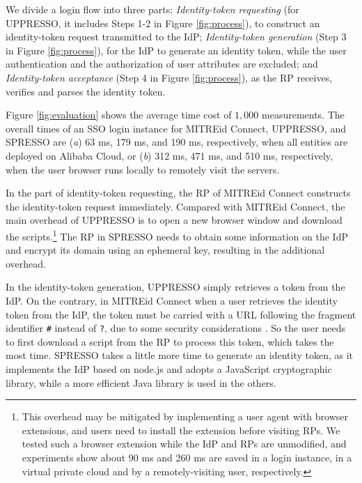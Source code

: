 We divide a login flow into three parts:
{\em Identity-token requesting} (for UPPRESSO, it includes Steps 1-2 in Figure \ref{fig:process}),
  to construct an identity-token request transmitted to the IdP;
{\em Identity-token generation} (Step 3 in Figure \ref{fig:process}),
    for the IdP to generate an identity token, while the user authentication and  the authorization of user attributes are excluded;
and {\em Identity-token acceptance} (Step 4 in Figure \ref{fig:process}),
    as the RP receives, verifies and parses the identity token.


Figure \ref{fig:evaluation} shows
        the average time cost of $1,000$ measurements.
The overall times of an SSO login instance for MITREid Connect, UPPRESSO, and SPRESSO are
 (\emph{a}) 63 ms, 179 ms, and 190 ms, respectively, when all entities are deployed on Alibaba Cloud,
or
 (\emph{b})
312 ms, 471 ms, and 510 ms, respectively, when the user browser runs locally to remotely visit the servers.

In the part of identity-token requesting, %
the RP of MITREid Connect constructs the identity-token request immediately.
Compared with MITREid Connect, the main overhead of UPPRESSO is to open a new browser window and download the scripts.\footnote{This overhead may be mitigated %
    by implementing a user agent with browser extensions,
and users need to install the extension
    before visiting RPs.
We tested such a browser extension while the IdP and RPs are unmodified,
and experiments show about 90 ms and 260 ms are saved in a login instance,
    in a virtual private cloud and by a remotely-visiting user, respectively.}
The RP in SPRESSO needs  to obtain some information on the IdP  %
     and encrypt its domain using an ephemeral key, resulting in the additional overhead.




In the identity-token generation,
UPPRESSO simply retrieves a token from the IdP.
On the contrary, in MITREid Connect when a user retrieves the identity token from the IdP,
 the token must be carried with a URL following the fragment identifier \verb+#+ instead of \verb+?+, due to some security considerations \cite{de2014oauth}.
So the user needs to first download a script from the RP to process this token, which takes the most time.
SPRESSO takes a little more time to generate an identity token,
    as it implements the IdP based on node.js and adopts a JavaScript cryptographic library,
 while a more efficient Java library is used in the others.

